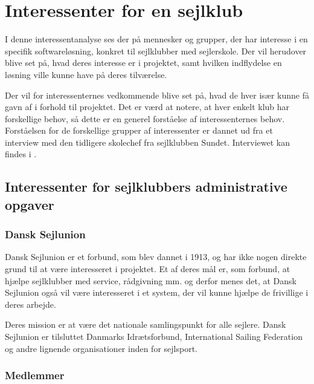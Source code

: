\chapter{Interessenter for en sejlklub}\label{chap:interessent-analyse-ved-sejlklubber}

I denne interessentanalyse ses der på mennesker og grupper, der har interesse i en specifik softwareløsning,
konkret til sejlklubber med sejlerskole. Der vil herudover blive set på, hvad deres interesse er i projektet,
samt hvilken indflydelse en løsning ville kunne have på deres tilværelse.

Der vil for interessenternes vedkommende blive set på, hvad de hver især kunne få gavn af i forhold til
projektet. Det er værd at notere, at hver enkelt klub har forskellige behov, så dette er en generel forståelse
af interessenternes behov. Forståelsen for de forskellige grupper af interessenter er dannet ud fra et
interview med den tidligere skolechef fra sejlklubben Sundet. Interviewet kan findes i
.


\section{Interessenter for sejlklubbers administrative opgaver}


\subsection{Dansk Sejlunion}

Dansk Sejlunion er et forbund, som blev dannet i 1913, og har ikke nogen direkte grund til at være
interesseret i projektet.  Et af deres mål er, som forbund, at hjælpe
sejlklubber med service, rådgivning mm. og derfor menes det, at Dansk Sejlunion også vil være interesseret i
et system, der vil kunne hjælpe de frivillige i deres arbejde.

Deres mission er at være det nationale samlingspunkt for alle sejlere. Dansk Sejlunion er tilsluttet Danmarks
Idrætsforbund, International Sailing Federation og andre lignende organisationer inden for sejlsport.
\citep{Sejlsportdk} 


\subsection{Medlemmer}

